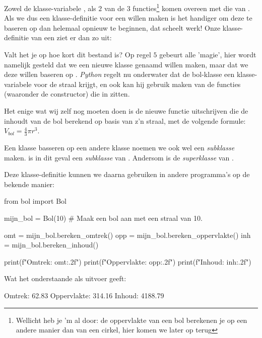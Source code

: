 Zowel de klasse-variabele , als $2$ van de $3$ functies\footnote{Wellicht heb je 'm al door: de oppervlakte van een bol berekenen je op een andere manier dan van een cirkel, hier komen we later op terug} komen overeen met die van . Als we dus een klasse-definitie voor een  willen maken is het handiger om deze te baseren op  dan helemaal opnieuw te beginnen, dat scheelt werk! Onze klasse-definitie van een  ziet er dan zo uit:


Valt het je op hoe kort dit bestand is? Op regel $5$ gebeurt alle 'magie', hier wordt namelijk gesteld dat we een nieuwe klasse genaamd  willen maken, maar dat we deze willen baseren op . \textit{Python} regelt nu onderwater dat de bol-klasse een klasse-variabele  voor de straal krijgt, en ook kan hij gebruik maken van de functies (waaronder de constructor) die in  zitten. \newline

Het enige wat wij zelf nog moeten doen is de nieuwe functie uitschrijven die de inhoudt van de bol berekend op basis van z'n straal, met de volgende formule: $V_{bol} = \frac{4}{3} \pi r^3$. \newline

\begin{remark}
  Een klasse basseren op een andere klasse noemen we ook wel een \textit{subklasse} maken.  is in dit geval een \textit{subklasse} van . Andersom is  de \textit{superklasse} van .
\end{remark}

Deze klasse-definitie kunnen we daarna gebruiken in andere programma's op de bekende manier:
\begin{python}
from bol import Bol

mijn_bol = Bol(10)  # Maak een bol aan met een straal van 10.

omt = mijn_bol.bereken_omtrek()
opp = mijn_bol.bereken_oppervlakte()
inh = mijn_bol.bereken_inhoud()

print(f"Omtrek: {omt:.2f}")
print(f"Oppervlakte: {opp:.2f}")
print(f"Inhoud: {inh:.2f}")
\end{python}

Wat het onderstaande als uitvoer geeft:
\begin{python}
Omtrek: 62.83
Oppervlakte: 314.16
Inhoud: 4188.79
\end{python}

